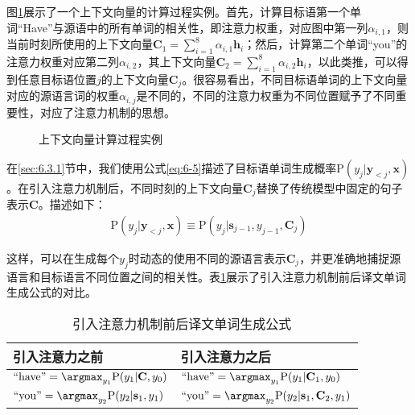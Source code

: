 \parinterval 图\ref{fig:6-25}展示了一个上下文向量的计算过程实例。首先，计算目标语第一个单词``Have''与源语中的所有单词的相关性，即注意力权重，对应图中第一列$\alpha_{i,1}$，则当前时刻所使用的上下文向量$\mathbf{C}_1 = \sum_{i=1}^8 \alpha_{i,1} \mathbf{h}_i$；然后，计算第二个单词``you''的注意力权重对应第二列$\alpha_{i,2}$，其上下文向量$\mathbf{C}_2 = \sum_{i=1}^8 \alpha_{i,2} \mathbf{h}_i$，以此类推，可以得到任意目标语位置$j$的上下文向量$\mathbf{C}_j$。很容易看出，不同目标语单词的上下文向量对应的源语言词的权重$\alpha_{i,j}$是不同的，不同的注意力权重为不同位置赋予了不同重要性，对应了注意力机制的思想。

\begin{figure}[htp]
\centering

\caption{上下文向量计算过程实例}
\label{fig:6-25}
\end{figure}

\parinterval 在\ref{sec:6.3.1}节中，我们使用公式\ref{eq:6-5}描述了目标语单词生成概率P$(y_j | \mathbf{y}_{<j},\mathbf{x})$。在引入注意力机制后，不同时刻的上下文向量$\mathbf{C}_j$替换了传统模型中固定的句子表示$\mathbf{C}$。描述如下：
\begin{eqnarray}
\textrm{P} (y_j | \mathbf{y}_{<j},\mathbf{x}) \equiv \textrm{P} (y_j | \mathbf{s}_{j-1},y_{j-1},\mathbf{C}_j )
\label{eq:6-26}
\end{eqnarray}

\parinterval 这样，可以在生成每个$y_j$时动态的使用不同的源语言表示$\mathbf{C}_j$，并更准确地捕捉源语言和目标语言不同位置之间的相关性。表\ref{tab:6-7}展示了引入注意力机制前后译文单词生成公式的对比。
\vspace{0.5em}

\begin{table}[htp]
\centering
\caption{引入注意力机制前后译文单词生成公式}
\label{tab:6-7}
\begin{tabular}{ l | l }
\rule{0pt}{13pt}	引入注意力之前			&引入注意力之后 \\ \hline
\rule{0pt}{16pt}	$\textrm{``have''} = \argmax_{y_1}\mathrm{P}(y_1 | \mathbf{C} , y_0)$		&$\textrm{``have''} = \argmax_{y_1}\mathrm{P}(y_1 | \mathbf{C}_1 , y_0)$	\\
\rule{0pt}{16pt}	$\textrm{``you''} = \argmax_{y_2}\mathrm{P}(y_2 | \mathbf{s}_1 , y_1)$			&$\textrm{``you''} = \argmax_{y_2}\mathrm{P}(y_2 | \mathbf{s}_1, \mathbf{C}_2 , y_1)$	\\
\end{tabular}
\end{table}


